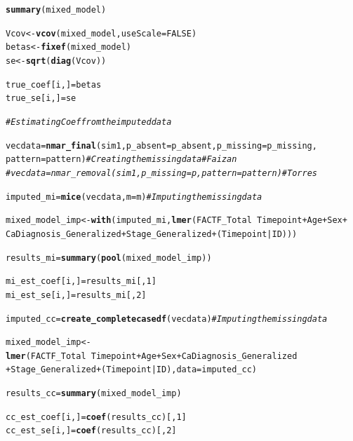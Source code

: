 \documentclass[fleqn,10pt]{wlscirep}\usepackage[]{graphicx}\usepackage[]{color}
\makeatletter
\newcommand{\hlnum}[1]{\textcolor[rgb]{0.686,0.059,0.569}{#1}}%
\newcommand{\hlcom}[1]{\textcolor[rgb]{0.678,0.584,0.686}{\textit{#1}}}%
\newcommand{\hlopt}[1]{\textcolor[rgb]{0,0,0}{#1}}%
\newcommand{\hlstd}[1]{\textcolor[rgb]{0.345,0.345,0.345}{#1}}%
\newcommand{\hlkwb}[1]{\textcolor[rgb]{0.69,0.353,0.396}{#1}}%
\newcommand{\hlkwc}[1]{\textcolor[rgb]{0.333,0.667,0.333}{#1}}%
\newcommand{\hlkwd}[1]{\textcolor[rgb]{0.737,0.353,0.396}{\textbf{#1}}}%
\newenvironment{kframe}{%
 \def\at@end@of@kframe{}%
 \ifinner\ifhmode%
  \def\at@end@of@kframe{\end{minipage}}%
  \begin{minipage}{\columnwidth}%
 \fi\fi%
 \def\FrameCommand##1{\hskip\@totalleftmargin \hskip-\fboxsep
 \colorbox{shadecolor}{##1}\hskip-\fboxsep
     \hskip-\linewidth \hskip-\@totalleftmargin \hskip\columnwidth}%
 \MakeFramed {\advance\hsize-\width
   \@totalleftmargin\z@ \linewidth\hsize
   \@setminipage}}%
 {\par\unskip\endMakeFramed%
 \at@end@of@kframe}
\newenvironment{knitrout}{}{} %
\makeatother
\begin{document}
\begin{knitrout}
\begin{kframe}
\begin{alltt}
    \hlkwd{summary}\hlstd{(mixed_model)}

    \hlstd{Vcov} \hlkwb{<-} \hlkwd{vcov}\hlstd{(mixed_model,} \hlkwc{useScale} \hlstd{=} \hlnum{FALSE}\hlstd{)}
    \hlstd{betas} \hlkwb{<-} \hlkwd{fixef}\hlstd{(mixed_model)}
    \hlstd{se} \hlkwb{<-} \hlkwd{sqrt}\hlstd{(}\hlkwd{diag}\hlstd{(Vcov))}

    \hlstd{true_coef[i, ]} \hlkwb{=} \hlstd{betas}
    \hlstd{true_se[i, ]} \hlkwb{=} \hlstd{se}

    \hlcom{# Estimating Coef from the imputed data}

    \hlstd{vecdata} \hlkwb{=} \hlkwd{nmar_final}\hlstd{(sim1,} \hlkwc{p_absent} \hlstd{= p_absent,} \hlkwc{p_missing} \hlstd{= p_missing,}
                         \hlkwc{pattern} \hlstd{= pattern)} \hlcom{# Creating the missing data # Faizan}
    \hlcom{#vecdata = nmar_removal(sim1, p_missing = p, pattern = pattern) # Torres}

    \hlstd{imputed_mi} \hlkwb{=} \hlkwd{mice}\hlstd{(vecdata,} \hlkwc{m} \hlstd{= m)} \hlcom{# Imputing the missing data}

    \hlstd{mixed_model_imp} \hlkwb{<-} \hlkwd{with}\hlstd{(imputed_mi,}\hlkwd{lmer}\hlstd{(FACTF_Total} \hlopt{~} \hlstd{Timepoint} \hlopt{+} \hlstd{Age} \hlopt{+} \hlstd{Sex} \hlopt{+}
                        \hlstd{CaDiagnosis_Generalized} \hlopt{+} \hlstd{Stage_Generalized} \hlopt{+} \hlstd{(Timepoint}\hlopt{|}\hlstd{ID)))}

    \hlstd{results_mi} \hlkwb{=} \hlkwd{summary}\hlstd{(}\hlkwd{pool}\hlstd{(mixed_model_imp))}

    \hlstd{mi_est_coef[i,]} \hlkwb{=} \hlstd{results_mi[,} \hlnum{1} \hlstd{]}
    \hlstd{mi_est_se[i, ]} \hlkwb{=} \hlstd{results_mi[,} \hlnum{2} \hlstd{]}

    \hlstd{imputed_cc} \hlkwb{=} \hlkwd{create_completecasedf}\hlstd{(vecdata)} \hlcom{# Imputing the missing data}

    \hlstd{mixed_model_imp} \hlkwb{<-} \hlkwd{lmer}\hlstd{(FACTF_Total} \hlopt{~} \hlstd{Timepoint} \hlopt{+} \hlstd{Age} \hlopt{+} \hlstd{Sex} \hlopt{+} \hlstd{CaDiagnosis_Generalized}
                            \hlopt{+} \hlstd{Stage_Generalized} \hlopt{+} \hlstd{(Timepoint}\hlopt{|}\hlstd{ID),} \hlkwc{data} \hlstd{= imputed_cc)}

    \hlstd{results_cc} \hlkwb{=} \hlkwd{summary}\hlstd{(mixed_model_imp)}

    \hlstd{cc_est_coef[i,]} \hlkwb{=} \hlkwd{coef}\hlstd{(results_cc)[,}\hlnum{1}\hlstd{]}
    \hlstd{cc_est_se[i, ]} \hlkwb{=} \hlkwd{coef}\hlstd{(results_cc)[,}\hlnum{2}\hlstd{]}



\end{alltt}
\end{kframe}
\end{knitrout}
\end{document}
